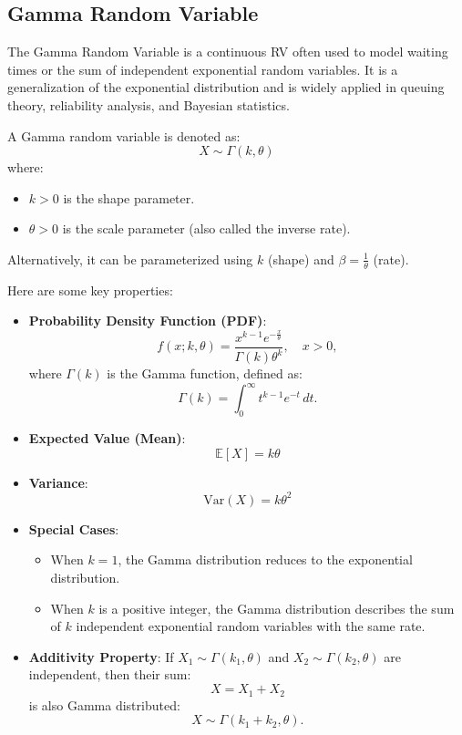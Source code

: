 \documentclass[a4paper]{article}
\begin{document}
\subsection{Gamma Random Variable}
The Gamma Random Variable is a continuous RV often used to model waiting times or the sum of independent exponential random variables. It is a generalization of the exponential distribution and is widely applied in queuing theory, reliability analysis, and Bayesian statistics.

A Gamma random variable is denoted as:
\[
X \sim \Gamma(k, \theta)
\]
where:
\begin{itemize}[label=$\circ$, itemsep=-0.2cm]

\item \(k > 0\) is the shape parameter.
\item \(\theta > 0\) is the scale parameter (also called the inverse rate).
\end{itemize}

Alternatively, it can be parameterized using \(k\) (shape) and \(\beta = \frac{1}{\theta}\) (rate).

Here are some key properties:
\begin{itemize}
    \item \textbf{Probability Density Function (PDF)}:
    \[
    f(x; k, \theta) = \frac{x^{k-1} e^{-\frac{x}{\theta}}}{\Gamma(k) \theta^k}, \quad x > 0,
    \]
    where \(\Gamma(k)\) is the Gamma function, defined as:
    \[
    \Gamma(k) = \int_0^\infty t^{k-1} e^{-t} \, dt.
    \]

    \item \textbf{Expected Value (Mean)}:
    \[
    \mathbb{E}[X] = k\theta
    \]

    \item \textbf{Variance}:
    \[
    \text{Var}(X) = k\theta^2
    \]

    \item \textbf{Special Cases}:
    \begin{itemize}
        \item When \(k = 1\), the Gamma distribution reduces to the exponential distribution.
        \item When \(k\) is a positive integer, the Gamma distribution describes the sum of \(k\) independent exponential random variables with the same rate.
    \end{itemize}

    \item \textbf{Additivity Property}: 
    If \(X_1 \sim \Gamma(k_1, \theta)\) and \(X_2 \sim \Gamma(k_2, \theta)\) are independent, then their sum:
    \[
    X = X_1 + X_2
    \]
    is also Gamma distributed:
    \[
    X \sim \Gamma(k_1 + k_2, \theta).
    \]
\end{itemize}
\end{document}
